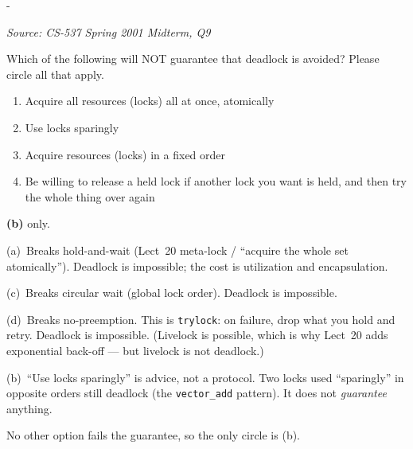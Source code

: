 \documentclass[11pt,a4paper]{article}
\makeatletter
\newcommand{\keepspace}[1]{\par\penalty-100\begingroup
  \setlength{\dimen@}{#1}\dimen@ii\pagegoal\advance\dimen@ii-\pagetotal
  \ifdim\dimen@>\dimen@ii\ifdim\dimen@ii>\z@\vfil\fi\break\fi\endgroup}
\newcounter{qn}[section]
\newenvironment{Qn}[4]{%
  \refstepcounter{qn}\keepspace{7\baselineskip}%
  \begin{tcolorbox}[qboxstyle, title={Q\thesection.\theqn\ \ [#1 \textbar\ #2]\ \ #4}]%
  {\footnotesize\color{g3}\textit{Source: #3}}\par\smallskip%
}{%
  \end{tcolorbox}%
}
\newenvironment{Sol}{%
  \begin{tcolorbox}[sboxstyle, title={Solution}]%
}{%
  \end{tcolorbox}\vspace{0.35em}%
}
\makeatother
\begin{document}
\begin{Qn}{Easy-Medium}{Lect 20}{CS-537 Spring 2001 Midterm, Q9}{Which of these does \emph{not} guarantee deadlock is avoided?}
Which of the following will NOT guarantee that deadlock is avoided? Please
circle all that apply.
\begin{enumerate}
  \item[(a)] Acquire all resources (locks) all at once, atomically
  \item[(b)] Use locks sparingly
  \item[(c)] Acquire resources (locks) in a fixed order
  \item[(d)] Be willing to release a held lock if another lock you want is
        held, and then try the whole thing over again
\end{enumerate}
\end{Qn}
\begin{Sol}
\textbf{(b)} only.

(a)~Breaks hold-and-wait (Lect~20 meta-lock / ``acquire the whole set
atomically''). Deadlock is impossible; the cost is utilization and
encapsulation.

(c)~Breaks circular wait (global lock order). Deadlock is impossible.

(d)~Breaks no-preemption. This is \texttt{trylock}: on failure, drop what
you hold and retry. Deadlock is impossible. (Livelock is possible, which
is why Lect~20 adds exponential back-off --- but livelock is not
deadlock.)

(b)~``Use locks sparingly'' is advice, not a protocol. Two locks used
``sparingly'' in opposite orders still deadlock (the
\texttt{vector\_add} pattern). It does not \emph{guarantee} anything.

No other option fails the guarantee, so the only circle is (b).
\end{Sol}
\end{document}
